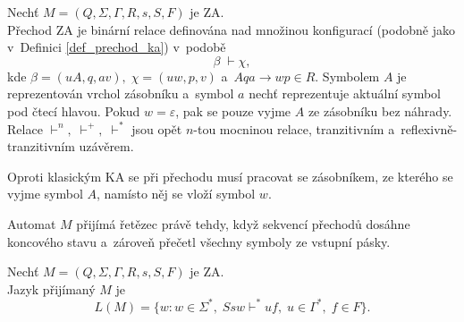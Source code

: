 \begin{definition}\label{def_prechod_za}
    Nechť $M = (Q, \Sigma, \Gamma, R, s, S, F)$ je ZA.\\
    Přechod ZA je binární relace definována nad množinou konfigurací (podobně jako v~Definici \ref{def_prechod_ka}) v~podobě
    \begin{equation*}
        \beta\; \vdash \chi,
    \end{equation*}
    kde $\beta = (uA, q, av),\; \chi = (uw, p, v)$ a~$Aqa \rightarrow wp \in R$.
    Symbolem $A$ je reprezentován vrchol zásobníku a~symbol $a$ nechť reprezentuje aktuální symbol pod čtecí hlavou.
    Pokud $w = \varepsilon$, pak se pouze vyjme $A$ ze zásobníku bez náhrady.
    Relace $\vdash^n,\; \vdash^+,\; \vdash^*$ jsou opět $n$-tou mocninou relace, tranzitivním a~reflexivně-tran\-zi\-tiv\-ním uzávěrem.
\end{definition}
Oproti klasickým KA se při přechodu musí pracovat se zásobníkem, ze kterého se vyjme symbol $A$, namísto něj se vloží symbol $w$.

Automat $M$ přijímá řetězec právě tehdy, když sekvencí přechodů dosáhne koncového stavu a~zároveň přečetl všechny symboly ze vstupní pásky.
\begin{definition}\label{def_jazyk_za}
    Nechť $M = (Q, \Sigma, \Gamma, R, s, S, F)$ je ZA.\\
    Jazyk přijímaný $M$ je
    \begin{equation*}
        L(M) = \{w : w \in \Sigma^*,\; Ssw \vdash^* uf,\; u \in \Gamma^*,\; f \in F\}.
    \end{equation*}
\end{definition}

